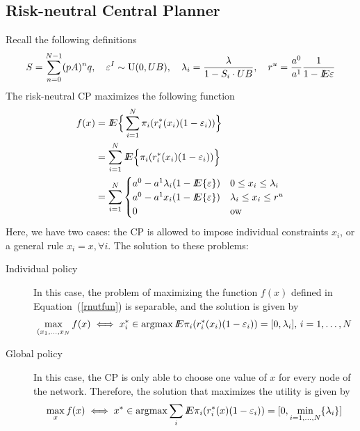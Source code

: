 \subsection{Risk-neutral Central Planner}
Recall the following definitions
\[S=\sum_{n=0}^{N-1}(pA)^nq,\quad \varepsilon^I\sim{\rm U}(0,UB),\quad \lambda_i=\frac{\lambda}{1-S_i\cdot UB}, \quad r^u=\frac{a^0}{a^1}\frac{1}{1-{I\kern-.35em E}\varepsilon}\]
The risk-neutral CP maximizes the following function
\begin{equation}\label{rnutfun}
\begin{align}
f(x)&={I\kern-.35em E}\Big\lbrace \sum_{i=1}^N \pi_i(r^*_i(x_i)(1-\varepsilon_i))\Big\rbrace\\
&=\sum_{i=1}^N {I\kern-.35em E}\Big\lbrace\pi_i(r^*_i(x_i)(1-\varepsilon_i))\Big\rbrace\\
&=\sum_{i=1}^N \begin{cases}
a^0-a^1\lambda_i(1-{I\kern-.35em E}\{\varepsilon\})&0\leq x_i\leq \lambda_i\\
a^0-a^1x_i(1-{I\kern-.35em E}\{\varepsilon\})&\lambda_i\leq x_i\leq r^u\\
0&{\rm ow}
\end{cases}
\end{align}
\end{equation}
Here, we have two cases: the CP is allowed to impose individual constraints $x_i$, or a general rule $x_i=x,\forall i$. The solution to these problems:
\begin{description}
\item[Individual policy] In this case, the problem of maximizing the function $f(x)$ defined in Equation~(\ref{rnutfun}) is separable, and the solution is given by
\begin{equation}\label{solrncpproind}
\max_{(x_1,\ldots,x_N} f(x)\iff x_i^*\in\mathop{\rm argmax} {I\kern-.35em E}\pi_i(r^*_i(x_i)(1-\varepsilon_i))=[0,\lambda_i],\,i=1,\ldots,N
\end{equation}

\item[Global policy] In this case, the CP is only able to choose one value of $x$ for every node of the network.  Therefore, the solution that maximizes the utility is given by
\begin{equation}\label{solrncpproglo}
\max_{x} f(x)\iff x^*\in\mathop{\rm argmax} \sum_i{I\kern-.35em E}\pi_i(r^*_i(x)(1-\varepsilon_i))=[0,\min_{i=1,\ldots,N}\{\lambda_i\}]
\end{equation}
\end{description}

